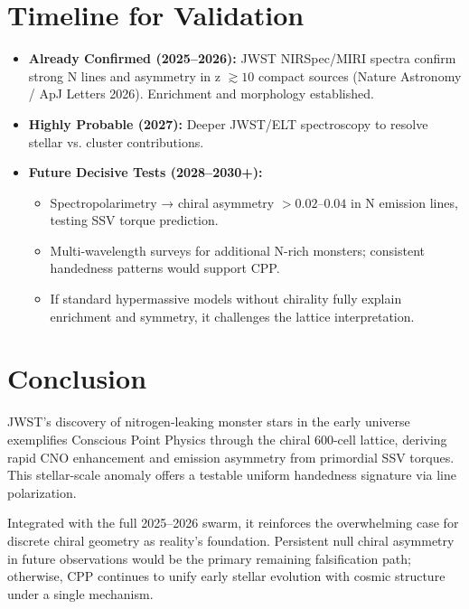 \documentclass[11pt]{article}
\begin{document}
\section{Timeline for Validation}
\begin{itemize}
    \item \textbf{Already Confirmed (2025--2026):} JWST NIRSpec/MIRI spectra confirm strong N lines and asymmetry in z $\gtrsim 10$ compact sources (Nature Astronomy / ApJ Letters 2026). Enrichment and morphology established.
    \item \textbf{Highly Probable (2027):} Deeper JWST/ELT spectroscopy to resolve stellar vs. cluster contributions.
    \item \textbf{Future Decisive Tests (2028--2030+):}
    \begin{itemize}
        \item Spectropolarimetry → chiral asymmetry $>0.02$--$0.04$ in N emission lines, testing SSV torque prediction.
        \item Multi-wavelength surveys for additional N-rich monsters; consistent handedness patterns would support CPP.
        \item If standard hypermassive models without chirality fully explain enrichment and symmetry, it challenges the lattice interpretation.
    \end{itemize}
\end{itemize}

\section{Conclusion}
JWST's discovery of nitrogen-leaking monster stars in the early universe exemplifies Conscious Point Physics through the chiral 600-cell lattice, deriving rapid CNO enhancement and emission asymmetry from primordial SSV torques. This stellar-scale anomaly offers a testable uniform handedness signature via line polarization.  

Integrated with the full 2025--2026 swarm, it reinforces the overwhelming case for discrete chiral geometry as reality's foundation. Persistent null chiral asymmetry in future observations would be the primary remaining falsification path; otherwise, CPP continues to unify early stellar evolution with cosmic structure under a single mechanism.
\end{document}
